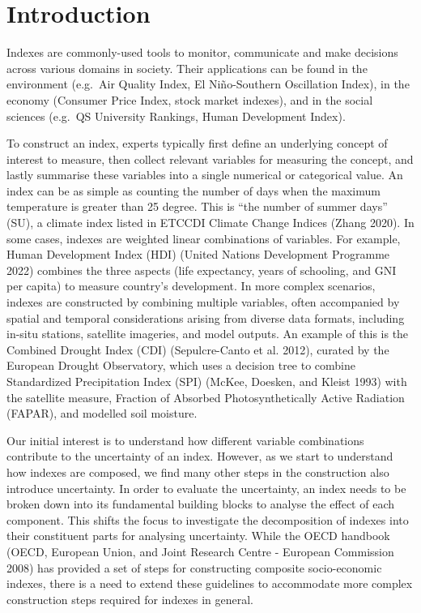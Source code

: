 \documentclass[
]{interact}
\begin{document}
\hypertarget{introduction}{%
\section{Introduction}\label{introduction}}

Indexes are commonly-used tools to monitor, communicate and make
decisions across various domains in society. Their applications can be
found in the environment (e.g.~Air Quality Index, El Niño-Southern
Oscillation Index), in the economy (Consumer Price Index, stock market
indexes), and in the social sciences (e.g.~QS University Rankings, Human
Development Index).

To construct an index, experts typically first define an underlying
concept of interest to measure, then collect relevant variables for
measuring the concept, and lastly summarise these variables into a
single numerical or categorical value. An index can be as simple as
counting the number of days when the maximum temperature is greater than
25 degree. This is ``the number of summer days'' (SU), a climate index
listed in ETCCDI Climate Change Indices (Zhang 2020). In some cases,
indexes are weighted linear combinations of variables. For example,
Human Development Index (HDI) (United Nations Development Programme
2022) combines the three aspects (life expectancy, years of schooling,
and GNI per capita) to measure country's development. In more complex
scenarios, indexes are constructed by combining multiple variables,
often accompanied by spatial and temporal considerations arising from
diverse data formats, including in-situ stations, satellite imageries,
and model outputs. An example of this is the Combined Drought Index
(CDI) (Sepulcre-Canto et al. 2012), curated by the European Drought
Observatory, which uses a decision tree to combine Standardized
Precipitation Index (SPI) (McKee, Doesken, and Kleist 1993) with the
satellite measure, Fraction of Absorbed Photosynthetically Active
Radiation (FAPAR), and modelled soil moisture.

Our initial interest is to understand how different variable
combinations contribute to the uncertainty of an index. However, as we
start to understand how indexes are composed, we find many other steps
in the construction also introduce uncertainty. In order to evaluate the
uncertainty, an index needs to be broken down into its fundamental
building blocks to analyse the effect of each component. This shifts the
focus to investigate the decomposition of indexes into their constituent
parts for analysing uncertainty. While the OECD handbook (OECD, European
Union, and Joint Research Centre - European Commission 2008) has
provided a set of steps for constructing composite socio-economic
indexes, there is a need to extend these guidelines to accommodate more
complex construction steps required for indexes in general.
\end{document}
